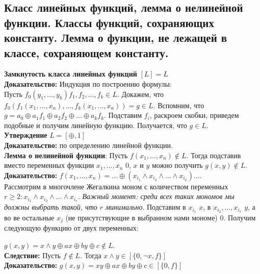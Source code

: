 \subsection{Класс линейных функций, лемма о нелинейной функции. Классы функций, сохраняющих константу. Лемма о функции, не лежащей в классе, сохраняющем константу.}
\textbf{Замкнутость класса линейных функций} $[L] = L$\\

\noindent \textbf{Доказательство:} Индукция по построению формулы:\\

Пусть $f_0(y_1, \ldots, y_k) f_1, f_2, \ldots, f_k \in L$. Докажем, что $f_0 (f_1(x_1,\ldots,x_n),\ldots,f_k(x_1,\ldots,x_n)) = g \in L$.
Вспомним, что $g = a_0 \oplus a_1f_1 \oplus a_2f_2 \oplus \ldots \oplus a_kf_k$. Подставим $f_i$, раскроем скобки, приведем подобные и получим линейную функцию. Получается, что $g \in L$.\\

\textbf{Утверждение} $L = [{\oplus, 1}]$\\

\noindent \textbf{Доказательство:} по определению линейной функции.\\

\textbf{Лемма о нелинейной функции}: Пусть $f(x_1, \ldots, x_n) \notin L$. Тогда подставив вместо переменных функции $x_1, \ldots, x_n$ 0, $x$ и $y$ можно получить $g(x, y) \notin L$.\\

\noindent \textbf{Доказательство:} $f(x_1,\ldots,x_n) = \ldots \oplus (x_{i_1} \wedge x_{i_2} \wedge \ldots \wedge x_{i_k}) \ldots$.\\

Рассмотрим в многочлене Жегалкина моном с количеством переменных $r \ge 2: x_{i_1} \wedge x_{i_2} \wedge \ldots \wedge x_{i_r}$. \textit{Важный момент: среди всех таких мономов мы должны выбрать такой, что $r$ минимально}. Подставим в $x_{i_1}$ $x$, в $x_{i_2}, \ldots, x_{i_r}$ $y$, а во ве остальные $x_j$ (не присутствующие в выбранном нами мономе) 0. Получим следующую функцию от двух переменных:

$g(x, y) = x \wedge y \oplus ax \oplus by \oplus c \notin L$.\\

\textbf{Следствие:} Пусть $f \notin L$. Тогда $x \wedge y \in [\{0, \neg x, f\}]$\\

\noindent \textbf{Доказательство:} $g(x, y) = xy \oplus ax \oplus by \oplus c \in [\{0, f\}]$\\

